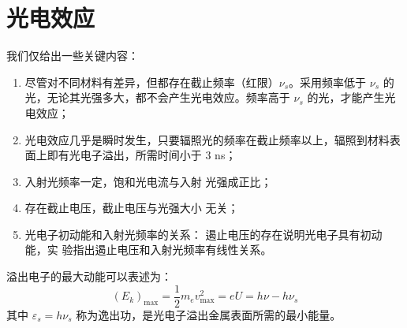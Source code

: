 \documentclass[UTF8]{report}
\theoremstyle{MyLineTheoremStyle} %
\theoremstyle{MyBlockTheoremStyle} %
\theoremstyle{MySubsubsectionStyle} %
\begin{document}
\section{光电效应}
\noindent 我们仅给出一些关键内容：
\begin{enumerate}
\item 尽管对不同材料有差异，但都存在截止频率（红限）$\nu_s$。采用频率低于 $\nu_s$ 的光，无论其光强多大，都不会产生光电效应。频率高于 $\nu_s$ 的光，才能产生光电效应；
\item 光电效应几乎是瞬时发生，只要辐照光的频率在截止频率以上，辐照到材料表面上即有光电子溢出，所需时间小于 3 ns；
\item 入射光频率一定，饱和光电流与入射
光强成正比；

\item 存在截止电压，截止电压与光强大小
无关；

\item 光电子初动能和入射光频率的关系：
遏止电压的存在说明光电子具有初动能，实
验指出遏止电压和入射光频率有线性关系。
\end{enumerate}
溢出电子的最大动能可以表述为：
\begin{equation}
\left(E_k\right)_{\max} = \frac{1}{2}m_e v_{\max}^2 = eU = h \nu - h \nu_s
\end{equation}
其中 $\varepsilon_s = h \nu_s$ 称为逸出功，是光电子溢出金属表面所需的最小能量。

\end{document}
